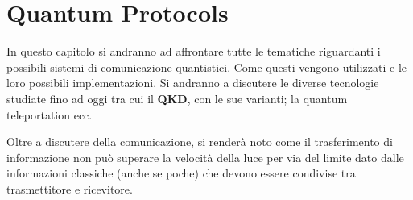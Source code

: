 \chapter{Quantum Protocols}
In questo capitolo si andranno ad affrontare tutte le tematiche riguardanti i possibili sistemi di comunicazione quantistici. Come questi vengono utilizzati e le loro possibili implementazioni. Si andranno a discutere le diverse tecnologie studiate fino ad oggi tra cui il \textbf{QKD}, con le sue varianti; la quantum teleportation ecc.

Oltre a discutere della comunicazione, si renderà noto come il trasferimento di informazione non può superare la velocità della luce per via del limite dato dalle informazioni classiche (anche se poche) che devono essere condivise tra trasmettitore e ricevitore.








